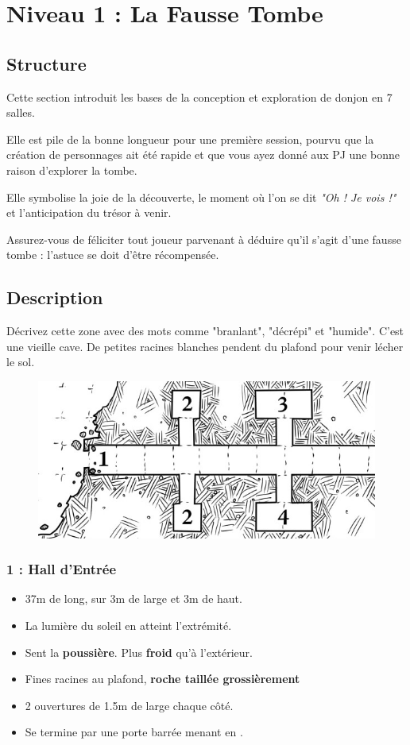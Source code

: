 \chapter{Niveau 1 : La Fausse Tombe}
\section{Structure}
Cette section introduit les bases de la conception et exploration de donjon en 7 salles.

Elle est pile de la bonne longueur pour une première session, pourvu que la création de personnages ait été rapide et que vous ayez donné aux PJ une bonne raison d'explorer la tombe.

Elle symbolise la joie de la découverte, le moment où l'on se dit \emph{"Oh ! Je vois !"} et l'anticipation du trésor à venir.

Assurez-vous de féliciter tout joueur parvenant à déduire qu'il s'agit d'une fausse tombe : l'astuce se doit d'être récompensée.
\vfill
\pagebreak
\section{Description}
Décrivez cette zone avec des mots comme "branlant", "décrépi" et "humide".
C'est une vieille cave.
De petites racines blanches pendent du plafond pour venir lécher le sol.
\vfill
\pagebreak

\begin{figure}[hb]
  \centering
  \includegraphics[width=\linewidth]{pics/map_1-4.jpg}
\end{figure}
\subsection{1 : Hall d’Entrée}\label{n1:s1}
\begin{itemize}
  \item 37m de long, sur 3m de large et 3m de haut.
  \item La lumière du soleil en atteint l’extrémité.
  \item Sent la \textbf{poussière}. Plus \textbf{froid} qu’à l’extérieur.
  \item Fines racines au plafond, \textbf{roche taillée grossièrement}
  \item 2 ouvertures de 1.5m de large chaque côté.
  \item Se termine par une porte barrée menant en \textbf{}.
\end{itemize}

